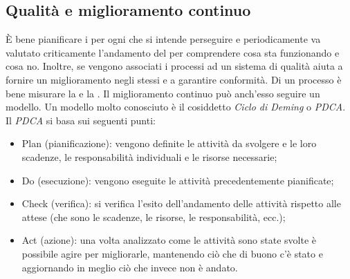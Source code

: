 \documentclass[../main]{subfiles}
\begin{document}
\subsection{Qualità e miglioramento continuo}
È bene pianificare i  per ogni  che si intende perseguire e periodicamente va valutato criticamente l'andamento del  per comprendere cosa sta funzionando e cosa no.
Inoltre, se vengono associati i processi ad un sistema di qualità aiuta a fornire un miglioramento negli stessi e a garantire conformità. Di un processo è bene misurare la  e la .
Il miglioramento continuo può anch'esso seguire un modello. Un modello molto conosciuto è il cosiddetto \textit{Ciclo di Deming} o \textit{PDCA}.
Il \textit{PDCA} si basa sui seguenti punti:
\begin{itemize}
    \item Plan (pianificazione): vengono definite le attività da svolgere e le loro scadenze, le responsabilità individuali e le risorse necessarie;
    \item Do (esecuzione): vengono eseguite le attività precedentemente pianificate;
    \item Check (verifica): si verifica l'esito dell'andamento delle attività rispetto alle attese (che sono le scadenze, le risorse, le responsabilità, ecc.);
    \item Act (azione): una volta analizzato come le attività sono state svolte è possibile agire per migliorarle, mantenendo ciò che di buono c'è stato e aggiornando in meglio ciò che invece non è andato.
\end{itemize}
\end{document}
